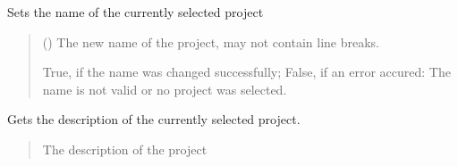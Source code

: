 \documentclass[letterpaper,10pt,english]{sphinxmanual}
\begin{document}
\begin{fulllineitems}
\begin{fulllineitems}
\begin{quote}
\begin{description}
\sphinxAtStartPar
{}

\end{description}\end{quote}

\end{fulllineitems}


\begin{fulllineitems}
\label{\detokenize{apidoc/src.osm_configurator.control:src.osm_configurator.control.settings_controller.SettingsController.set_project_name}}
\pysigstartsignatures
{}
\pysigstopsignatures
\sphinxAtStartPar
Sets the name of the currently selected project
\begin{quote}\begin{description}
\sphinxAtStartPar
{} () \textendash{} The new name of the project, may not contain line breaks.

\sphinxAtStartPar
True, if the name was changed successfully; False, if an error accured: The name is not valid or no project was selected.

\sphinxAtStartPar
{}

\end{description}\end{quote}

\end{fulllineitems}


\begin{fulllineitems}
\label{\detokenize{apidoc/src.osm_configurator.control:src.osm_configurator.control.settings_controller.SettingsController.get_project_description}}
\pysigstartsignatures
{}
\pysigstopsignatures
\sphinxAtStartPar
Gets the description of the currently selected project.
\begin{quote}\begin{description}
\sphinxAtStartPar
The description of the project


\end{description}
\end{quote}
\end{fulllineitems}
\end{fulllineitems}
\end{document}
